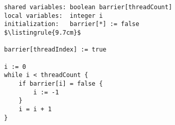 \begin{center}
\begin{minipage}{\textwidth}
\begin{lstlisting}[mathescape, linewidth=9.7cm]
shared variables: boolean barrier[threadCount]
local variables:  integer i
initialization:   barrier[*] := false
$\listingrule{9.7cm}$

barrier[threadIndex] := true

i := 0
while i < threadCount {
	if barrier[i] = false {
		i := -1
	}
	i = i + 1
}
\end{lstlisting}
\end{minipage}
\end{center}
